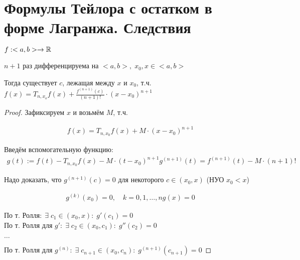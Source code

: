 \section{Формулы Тейлора с остатком в форме Лагранжа. Следствия}

\begin{theorem-non}
    $f: <a, b> \rightarrow \mathbb{R}$

    $n + 1$ раз дифференцируема на $<a, b>, \; x_0, x \in <a, b>$

    Тогда существует $c$, лежащая между $x$ и $x_0$, т.ч.
    $f(x) = T_{n,x_o} f(x) + \frac{f^{(n+1)}(c)}{(n+1)!} \cdot (x - x_0)^{n+1}$

    \begin{proof}
        Зафиксируем $x$ и возьмём $M$, т.ч.
        
        \begin{gather*}
            f(x) = T_{n,x_0} f(x) + M \cdot (x - x_0)^{n+1}
        \end{gather*}

        Введём вспомогательную функцию:
        \begin{gather*}
            g(t) := f(t) - T_{n, x_0}f(x) - M \cdot (t - x_0)^{n+1}
            g^{(n+1)}(t) = f^{(n+1)}(t) - M \cdot (n + 1)!
        \end{gather*}
        
        Надо доказать, что $g^{(n+1)}(c) = 0$ для некоторого $c \in (x_0, x)$ (НУО $x_0 < x$)

        \begin{gather*}
            g^{(k)}(x_0) = 0, \quad k = 0,1, \dots, n
            g(x) = 0
        \end{gather*}
        
        По т. Ролля$: \; \exists \; c_1 \in (x_0, x): \; g'(c_1) = 0$ \\
        По т. Ролля для $g': \; \exists \; c_2 \in (x_0, c_1): \; g''(c_2) = 0$

        $\dots$

        По т. Ролля для $g^{(n)}: \; \exists \; c_{n+1} \in (x_0, c_n): \; g^{(n+1)}(c_{n+1}) = 0$

    \end{proof}

\end{theorem-non}

